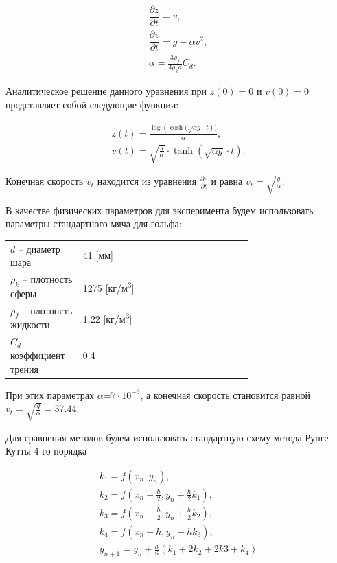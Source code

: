 \documentclass[master, och, diploma, times]{sty/SCWorks}
\theoremstyle{plain}
\theoremstyle{definition}
\numberwithin{equation}{section}
\begin{document}
\begin{equation}
\begin{aligned}
\dfrac{\partial z}{ \partial t} = v, \\
\dfrac{\partial v}{ \partial t} = g - \alpha v^2, \\
\alpha = \frac{3\rho_f}{4\rho_k d}C_d.
\end{aligned}
\end{equation}

\noindent Аналитическое решение данного уравнения при $z(0)=0$ и $v(0)=0$ представляет собой следующие функции:

\begin{equation}
\begin{aligned}
z(t)=\frac{\log{(\cosh{(\sqrt{\alpha g} \cdot t})})}{\alpha}, \\
v(t)=\sqrt{\frac{g}{\alpha}} \cdot \tanh{(\sqrt{\alpha g} \cdot t)}.
\end{aligned}
\end{equation}

\noindent Конечная скорость $v_t$ находится из уравнения $\frac{\partial v}{ \partial t}$ и равна $v_t=\sqrt{\frac{g}{\alpha}}$.

В качестве физических параметров для эксперимента будем использовать параметры стандартного мяча для гольфа:

\begin{threeparttable}
\begin{longtable}[H]{lp{0.7\linewidth}}
{$d$} -- диаметр шара & 41 [мм] \\
{$\rho_k$} -- плотность сферы & 1275 [кг/м\textsuperscript{3}] \\
{$\rho_f$} -- плотность жидкости & 1.22 [кг/м\textsuperscript{3}] \\
{$C_d$} -- коэффициент трения & 0.4 
\end{longtable} 
\end{threeparttable}


При этих параметрах $\alpha$=$7 \cdot 10^{-3}$, а конечная скорость становится равной $v_t=\sqrt{\frac{g}{\alpha}}=37.44$.

Для сравнения методов будем использовать стандартную схему метода Рунге-Кутты 4-го порядка

\begin{equation}%
\begin{aligned}
k_1 = f(x_n, y_n), \\
k_2 = f(x_n+\frac{h}{2}, y_n+\frac{h}{2}k_1), \\
k_3 = f(x_n+\frac{h}{2}, y_n+\frac{h}{2}k_2), \\ 
k_4 = f(x_n+h, y_n+hk_3), \\
y_{n+1}=y_n+\frac{h}{6}(k_1+2k_2+2k3+k_4)
\end{aligned}
\end{equation}
\end{document}
